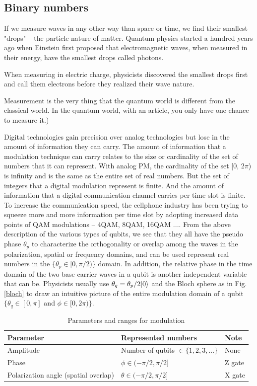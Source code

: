 \documentclass[Letter,11pt]{book}
\begin{document}
\subsection{Binary numbers}

If we measure waves in any other way than space or time, we find their smallest "drops" -- the particle nature of matter. Quantum physics started a hundred years ago when Einstein first proposed that electromagnetic waves, when measured in their energy, have the smallest drops called photons.

When measuring in electric charge, physicists discovered the smallest drops first and call them electrons before they realized their wave nature.

Measurement is the very thing that the quantum world is different from the classical world. In the quantum world, with an article, you only have one chance to measure it.)

Digital technologies gain precision over analog technologies but lose in the amount of information they can carry. The amount of information that a modulation technique can carry relates to the size or cardinality of the set of numbers that it can represent. With analog PM, the cardinality of the set [0, 2$\pi$) is infinity and is the same as the entire set of real numbers. But the set of integers that a digital modulation represent is finite. And the amount of information that a digital communication channel carries per time slot is finite. To increase the communication speed, the cellphone industry has been trying to squeeze more and more information per time slot by adopting increased data points of QAM modulations -- 4QAM, 8QAM, 16QAM ....
From the above description of the various types of qubits, we see that they all have the pseudo phase $\theta_p$ to characterize the 
orthogonality or overlap among the waves in the polarization, spatial or frequency domains, and can be used represent real numbers in the $\{\theta_p \in [0, \pi/2)\}$ domain. In addition, the relative phase in the time domain of the two base carrier waves in a qubit is another independent variable that can be. Physicists usually use $\theta_q = \theta_p/2 \vert {0} \rangle_{}$ and the Bloch sphere as in Fig. \ref{bloch} to draw an intuitive picture of the entire modulation domain of a qubit $\{\theta_q \in [0, \pi]$ and $\phi \in [0, 2\pi)\}$.

\begin{table}[]
\caption{Parameters and ranges for modulation}
\label{modulation-parameters}
\begin{tabular}{|l|l|l|}
\hline Parameter &Represented numbers &Note                 \\
\hline Amplitude &Number of qubits $\in \{1, 2, 3, ...\}$   & None \\
\hline Phase & $\phi \in (-\pi /2, \pi /2] $& Z gate \\
\hline Polarization angle (spatial overlap) & $\theta \in (-\pi /2, \pi /2]$ &X gate \\
\hline
\end{tabular}
\end{table}
\end{document}
